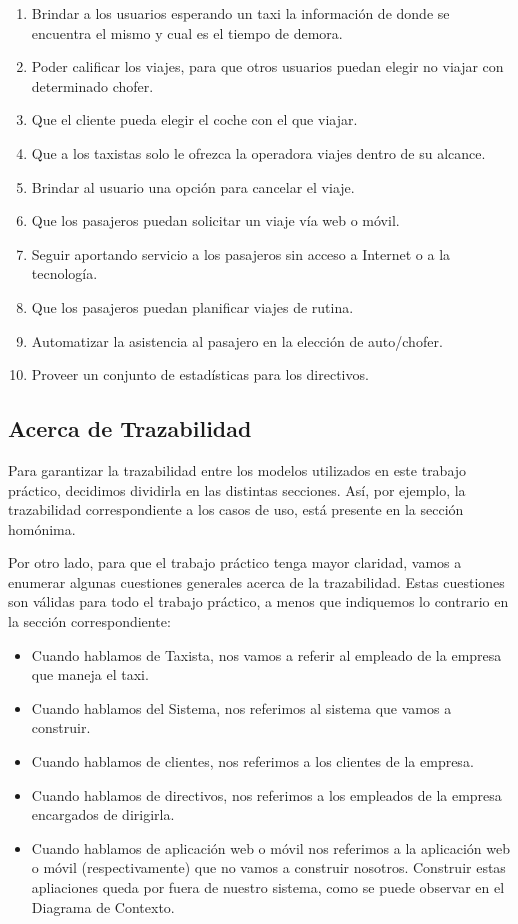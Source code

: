 \documentclass[a4paper, 10pt, twoside]{article}
\begin{document}
\begin{enumerate}
 \item Brindar a los usuarios esperando un taxi la información de donde se encuentra el mismo y cual es el tiempo de demora.
 \item Poder calificar los viajes, para que otros usuarios puedan elegir no viajar con determinado chofer.
 \item Que el cliente pueda elegir el coche con el que viajar.
 \item Que a los taxistas solo le ofrezca la operadora viajes dentro de su alcance.
 \item Brindar al usuario una opción para cancelar el viaje.
 \item Que los pasajeros puedan solicitar un viaje vía web o móvil.
 \item Seguir aportando servicio a los pasajeros sin acceso a Internet o a la tecnología.
 \item Que los pasajeros puedan planificar viajes de rutina.
 \item Automatizar la asistencia al pasajero en la elección de auto/chofer.
 \item Proveer un conjunto de estadísticas para los directivos.
\end{enumerate}

\subsection{Acerca de Trazabilidad}

Para garantizar la trazabilidad entre los modelos utilizados en este trabajo práctico, decidimos dividirla en las distintas secciones. Así, por ejemplo, la trazabilidad correspondiente a los casos de uso, está presente en la sección homónima.

Por otro lado, para que el trabajo práctico tenga mayor claridad, vamos a enumerar algunas cuestiones generales acerca de la trazabilidad. Estas cuestiones son válidas para todo el trabajo práctico, a menos que indiquemos lo contrario en la sección correspondiente:

\begin{itemize}
	\item Cuando hablamos de Taxista, nos vamos a referir al empleado de la empresa que maneja el taxi.
	\item Cuando hablamos del Sistema, nos referimos al sistema que vamos a construir.
	\item Cuando hablamos de clientes, nos referimos a los clientes de la empresa.
	\item Cuando hablamos de directivos, nos referimos a los empleados de la empresa encargados de dirigirla.
	\item Cuando hablamos de aplicación web o móvil nos referimos a la aplicación web o móvil (respectivamente) que no vamos a construir nosotros. Construir estas apliaciones queda por fuera de nuestro sistema, como se puede observar en el Diagrama de Contexto.
\end{itemize}
\end{document}
